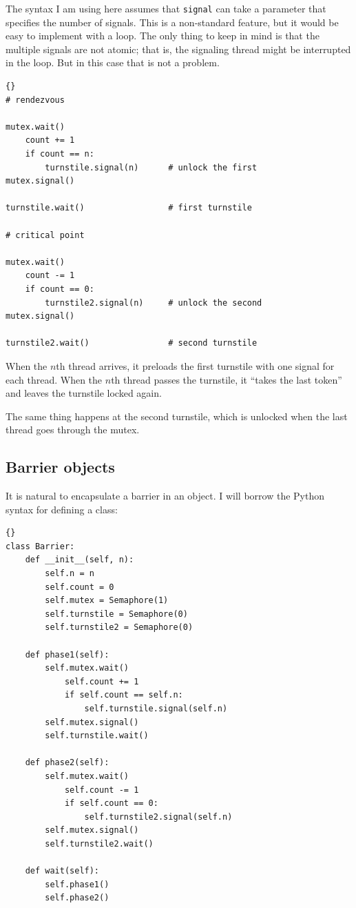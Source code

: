 \documentclass{book}
\begin{document}
The syntax I am using here assumes that {\tt signal} can take a
parameter that specifies the number of signals.  This is a
non-standard feature, but it would be easy to implement with a loop.
The only thing to keep in mind is that the multiple signals are not
atomic; that is, the signaling thread might be interrupted in the
loop.  But in this case that is not a problem.

\begin{lstlisting}[caption={Reusable barrier solution}]{}
# rendezvous

mutex.wait()
    count += 1
    if count == n:
        turnstile.signal(n)      # unlock the first
mutex.signal()

turnstile.wait()                 # first turnstile

# critical point

mutex.wait()
    count -= 1
    if count == 0:
        turnstile2.signal(n)     # unlock the second
mutex.signal()

turnstile2.wait()                # second turnstile
\end{lstlisting}

When the $n$th thread arrives, it preloads the first turnstile with
one signal for each thread.  When the $n$th thread passes the
turnstile, it ``takes the last token'' and leaves the turnstile locked
again.

The same thing happens at the second turnstile, which is
unlocked when the last thread goes through the mutex.


\newpage
\subsection {Barrier objects}

It is natural to encapsulate a barrier in an object.  I will
borrow the Python syntax for defining a class:

\begin{lstlisting}[caption={Barrier class}]{}
class Barrier:
    def __init__(self, n):
        self.n = n
        self.count = 0
        self.mutex = Semaphore(1)
        self.turnstile = Semaphore(0)
        self.turnstile2 = Semaphore(0)

    def phase1(self):
        self.mutex.wait()
            self.count += 1
            if self.count == self.n:
                self.turnstile.signal(self.n) 
        self.mutex.signal()
        self.turnstile.wait()            

    def phase2(self):
        self.mutex.wait()
            self.count -= 1
            if self.count == 0:
                self.turnstile2.signal(self.n)
        self.mutex.signal()
        self.turnstile2.wait()

    def wait(self):
        self.phase1()
        self.phase2()
\end{lstlisting}
\end{document}
